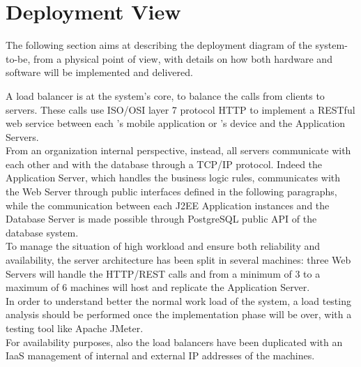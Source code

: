\documentclass[../../DD.tex]{subfiles}
\begin{document}
\section{Deployment View\label{sect:2.3}}

The following section aims at describing the deployment diagram of the system-to-be, from a physical point of view, with details on how both hardware and software will be implemented and delivered.


A load balancer is at the system's core, to balance the calls from clients to servers. These calls use ISO/OSI layer 7 protocol HTTP to implement a RESTful web service between each 's mobile application or 's device and the Application Servers. \\ 

From an organization internal perspective, instead, all servers communicate with each other and with the database through a TCP/IP protocol. Indeed the Application Server, which handles the business logic rules, communicates with the Web Server through public interfaces defined in the following paragraphs, while the communication between each J2EE Application instances and the Database Server is made possible through PostgreSQL public API of the database system. \\

To manage the situation of high workload and ensure both reliability and availability, the server architecture has been split in several machines: three Web Servers will handle the HTTP/REST calls and from a minimum of 3 to a maximum of 6 machines will host and replicate the Application Server. \\
In order to understand better the normal work load of the system, a load testing analysis should be performed once the implementation phase will be over, with a testing tool like Apache JMeter. \\
For availability purposes, also the load balancers have been duplicated with an IaaS management of internal and external IP addresses of the machines. \\\\

\newpage
\end{document}

